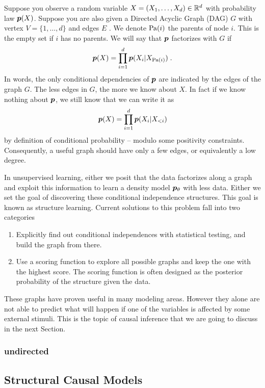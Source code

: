 Suppose you observe a random variable $X=(X_1, \dots, X_d) \in \mathbb{R}^d$ with probability law $\bm{p}(X)$. Suppose you are also given a Directed Acyclic Graph (DAG) $G$ with vertex $V=\{1, \dots, d \}$ and edges $E$ . We denote $\operatorname{\mathrm{Pa}}(i)$ the parents of node $i$. This is the empty set if $i$ has no parents. We will say that $\bm{p}$ factorizes with $G$ if
\begin{align}
    \bm{p}(X) = \prod_{i=1}^d \bm{p}(X_i | X_{\operatorname{\mathrm{Pa}}(i)}) \; .
\end{align}
In words, the only conditional dependencies of $\bm{p}$ are indicated by the edges of the graph $G$. The less edges in $G$, the more we know about $X$. In fact if we know nothing about $\bm{p}$, we still know that we can write it as 
\begin{align}
    \bm{p}(X) = \prod_{i=1}^d \bm{p}(X_i | X_{<i} )\textbf{}
\end{align}
by definition of conditional probability -- modulo some positivity constraints. Consequently, a useful graph should have only a few edges, or equivalently a low degree.

In unsupervised learning, either we posit that the data factorizes along a graph and exploit this information to learn a density model $\bm{p}_{\theta}$ with less data. Either we set the goal of discovering these conditional independence structures. This goal is known as structure learning. Current solutions to this problem fall into two categories
\begin{enumerate}
    \item Explicitly find out conditional independences with statistical testing, and build the graph from there.
    \item Use a scoring function to explore all possible graphs and keep the one with the highest score. The scoring function is often designed as the posterior probability of the structure given the data.
\end{enumerate}

These graphs have proven useful in many modeling areas. However they alone are not able to predict what will happen if one of the variables is affected by some external stimuli. This is the topic of causal inference that we are going to discuss in the next Section.


\subsubsection{undirected}


\subsection{Structural Causal Models}
\label{ssec:SCM}

